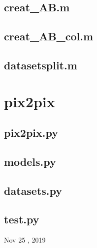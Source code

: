 \documentclass[11pt]{article}
\begin{document}
	\subsection{creat\_AB.m}
	\vspace{-0.25cm}
	 
	\vspace{0.25cm}
	
	\subsection{creat\_AB\_col.m}
	\vspace{-0.25cm}
	 
	\vspace{0.25cm}
	
	\subsection{datasetsplit.m}
	\vspace{-0.25cm}
	 
	\vspace{0.25cm}
	
	\section{pix2pix}
	
	\subsection{pix2pix.py}
		\vspace{-0.25cm}
		 
		\vspace{0.25cm}
		
 	\subsection{models.py}
 		\vspace{-0.25cm}
 		
 		\vspace{0.25cm}
 		
 	\subsection{datasets.py}
 		\vspace{-0.25cm}
		
		\vspace{0.25cm} 
		 
	\subsection{test.py}
		\vspace{-0.25cm}
		

	\begin{flushright}
		\tiny Nov 25 , 2019
	\end{flushright}
\end{document}
